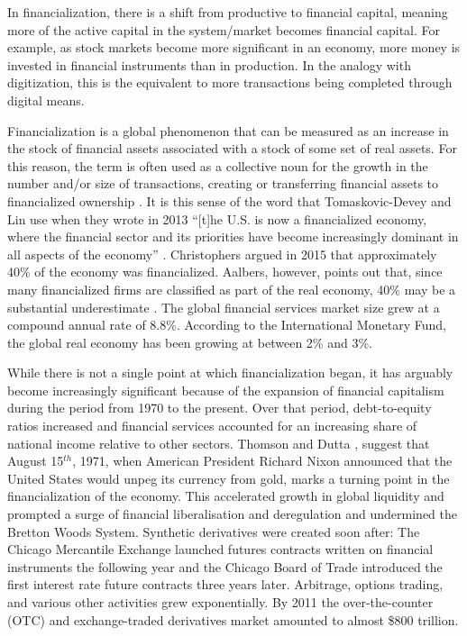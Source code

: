In financialization, there is a shift from productive to financial capital, meaning more of the active capital in the system/market becomes financial capital. 
For example, as stock markets become more significant in an economy, more money is invested in financial instruments than in production. In the analogy with digitization, this is the equivalent to more transactions being completed through digital means. 


Financialization is a global phenomenon that can be measured as an increase in the stock of financial assets associated with a stock of some set of real assets. For this reason, the term is often used as a collective noun for the growth in the number and/or size of transactions, creating or transferring financial assets to financialized ownership \cite{GET_financialization-numberOfTransactions}. %
It is this sense of the word that Tomaskovic-Devey and Lin use when they wrote in 2013 ``[t]he U.S. is now a financialized economy, where the financial sector and its priorities have become increasingly dominant in all aspects of the economy'' \cite{tomaskovic-deveyFinancializationCausesInequality2013}. Christophers argued in 2015 that approximately 40\% of the economy was financialized. Aalbers, however, points out that, since many financialized firms are classified as part of the real economy, 40\% may be a substantial underestimate \cite{aalbersPotentialFinancialization2015}.  The global financial services market size grew at a compound annual rate of 8.8\%. According to the International Monetary Fund,  the global real economy has been growing at between 2\% and 3\%.

While there is not a single point at which financialization began, it has arguably become increasingly significant because of the expansion of financial capitalism during the period from 1970 to the present. Over that period,  debt-to-equity ratios increased and financial services accounted for an increasing share of national income relative to other sectors. Thomson and Dutta \cite{thomsonFinancialisationPrimer2018}, suggest that August 15$^{th}$, 1971, when American President Richard Nixon announced that the United States would unpeg its currency from gold, marks a turning point in the financialization of the economy. This accelerated growth in global liquidity and prompted a surge of financial liberalisation and deregulation and undermined the Bretton Woods System. Synthetic derivatives were created soon after: The Chicago Mercantile Exchange launched futures contracts written on financial instruments the following year and the Chicago Board of Trade introduced the first interest rate future contracts three years later. Arbitrage, options trading, and various other activities grew exponentially. By 2011 the over-the-counter (OTC) and exchange-traded derivatives market amounted to almost \$800 trillion. 

